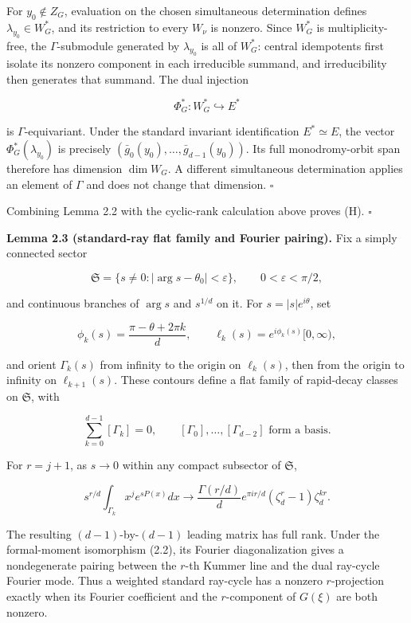 \documentclass[
  11pt,
  a4paper,
]{amsart}
\begin{document}
For \(y_0\notin Z_G\), evaluation on the chosen simultaneous
determination defines \(\lambda_{y_0}\in W_G^*\), and its restriction to
every \(W_\nu\) is nonzero. Since \(W_G^*\) is multiplicity-free, the
\(\Gamma\)-submodule generated by \(\lambda_{y_0}\) is all of \(W_G^*\):
central idempotents first isolate its nonzero component in each
irreducible summand, and irreducibility then generates that summand. The
dual injection

\[
\Phi_G^*:W_G^*\hookrightarrow E^*
\]

is \(\Gamma\)-equivariant. Under the standard invariant identification
\(E^*\simeq E\), the vector \(\Phi_G^*(\lambda_{y_0})\) is precisely
\((\bar g_0(y_0),\ldots,\bar g_{d-1}(y_0))\). Its full monodromy-orbit
span therefore has dimension \(\dim W_G\). A different simultaneous
determination applies an element of \(\Gamma\) and does not change that
dimension. \(\square\)

Combining Lemma 2.2 with the cyclic-rank calculation above proves (H).
\(\square\)

\textbf{Lemma 2.3 (standard-ray flat family and Fourier pairing).} Fix a
simply connected sector

\[
\mathfrak S=\{s\ne0:|\arg s-\theta_0|<\varepsilon\},
\qquad0<\varepsilon<\pi/2,
\]

and continuous branches of \(\arg s\) and \(s^{1/d}\) on it. For
\(s=|s|e^{i\theta}\), set

\[
\phi_k(s)=\frac{\pi-\theta+2\pi k}{d},\qquad
\ell_k(s)=e^{i\phi_k(s)}[0,\infty),
\]

and orient \(\Gamma_k(s)\) from infinity to the origin on \(\ell_k(s)\),
then from the origin to infinity on \(\ell_{k+1}(s)\). These contours
define a flat family of rapid-decay classes on \(\mathfrak S\), with

\[
\sum_{k=0}^{d-1}[\Gamma_k]=0,
\qquad [\Gamma_0],\ldots,[\Gamma_{d-2}]
\text{ form a basis}.
\]

For \(r=j+1\), as \(s\to0\) within any compact subsector of
\(\mathfrak S\),

\[
s^{r/d}\int_{\Gamma_k}x^je^{sP(x)}dx
\longrightarrow
\frac{\Gamma(r/d)}d e^{\pi ir/d}
(\zeta_d^r-1)\zeta_d^{kr}.                              \tag{2.4}
\]

The resulting \((d-1)\)-by-\((d-1)\) leading matrix has full rank. Under
the formal-moment isomorphism (2.2), its Fourier diagonalization gives a
nondegenerate pairing between the \(r\)-th Kummer line and the dual
ray-cycle Fourier mode. Thus a weighted standard ray-cycle has a nonzero
\(r\)-projection exactly when its Fourier coefficient and the
\(r\)-component of \(G(\xi)\) are both nonzero.
\end{document}
